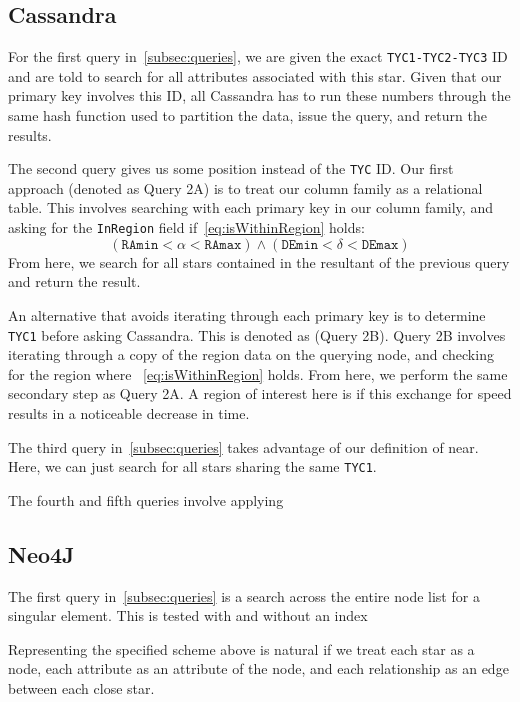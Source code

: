 \subsection{Cassandra}\label{subsec:cassandra}
For the first query in~\autoref{subsec:queries}, we are given the exact \texttt{TYC1-TYC2-TYC3} ID and are told to
search for all attributes associated with this star.
Given that our primary key involves this ID, all Cassandra has to run these numbers through the same hash function
used to partition the data, issue the query, and return the results.

The second query gives us some position instead of the \texttt{TYC} ID\@.
Our first approach (denoted as Query 2A) is to treat our column family as a relational table.
This involves searching with each primary key in our column family, and asking for the \texttt{InRegion} field
if~\autoref{eq:isWithinRegion} holds:
\begin{equation}\label{eq:isWithinRegion}
    \left(\texttt{RAmin} < \alpha < \texttt{RAmax}\right) \land \left(\texttt{DEmin} < \delta < \texttt{DEmax}\right)
\end{equation}
From here, we search for all stars contained in the resultant of the previous query and return the result.

An alternative that avoids iterating through each primary key is to determine \texttt{TYC1} before asking Cassandra.
This is denoted as (Query 2B).
Query 2B involves iterating through a copy of the region data on the querying node, and checking for the region where
~\autoref{eq:isWithinRegion} holds.
From here, we perform the same secondary step as Query 2A\@.
A region of interest here is if this exchange for speed results in a noticeable decrease in time.

The third query in~\autoref{subsec:queries} takes advantage of our definition of near.
Here, we can just search for all stars sharing the same \texttt{TYC1}.

The fourth and fifth queries involve applying

\subsection{Neo4J}\label{subsec:neo4j}
The first query in~\autoref{subsec:queries} is a search across the entire node list for a singular element.
This is tested with and without an index

Representing the specified scheme above is natural if we treat each star as a node, each attribute as an attribute
of the node, and each relationship as an edge between each close star.

